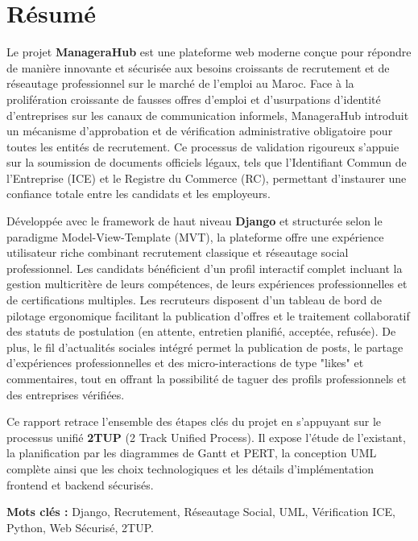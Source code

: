 \chapter*{Résumé}

Le projet \textbf{ManageraHub} est une plateforme web moderne conçue pour répondre de manière innovante et sécurisée aux besoins croissants de recrutement et de réseautage professionnel sur le marché de l'emploi au Maroc. Face à la prolifération croissante de fausses offres d'emploi et d'usurpations d'identité d'entreprises sur les canaux de communication informels, ManageraHub introduit un mécanisme d'approbation et de vérification administrative obligatoire pour toutes les entités de recrutement. Ce processus de validation rigoureux s'appuie sur la soumission de documents officiels légaux, tels que l'Identifiant Commun de l'Entreprise (ICE) et le Registre du Commerce (RC), permettant d'instaurer une confiance totale entre les candidats et les employeurs.

Développée avec le framework de haut niveau \textbf{Django} et structurée selon le paradigme Model-View-Template (MVT), la plateforme offre une expérience utilisateur riche combinant recrutement classique et réseautage social professionnel. Les candidats bénéficient d'un profil interactif complet incluant la gestion multicritère de leurs compétences, de leurs expériences professionnelles et de certifications multiples. Les recruteurs disposent d'un tableau de bord de pilotage ergonomique facilitant la publication d'offres et le traitement collaboratif des statuts de postulation (en attente, entretien planifié, acceptée, refusée). De plus, le fil d'actualités sociales intégré permet la publication de posts, le partage d'expériences professionnelles et des micro-interactions de type "likes" et commentaires, tout en offrant la possibilité de taguer des profils professionnels et des entreprises vérifiées.

Ce rapport retrace l'ensemble des étapes clés du projet en s'appuyant sur le processus unifié \textbf{2TUP} (2 Track Unified Process). Il expose l'étude de l'existant, la planification par les diagrammes de Gantt et PERT, la conception UML complète ainsi que les choix technologiques et les détails d'implémentation frontend et backend sécurisés.

\vspace{0.5cm}
\noindent \textbf{Mots clés :} Django, Recrutement, Réseautage Social, UML, Vérification ICE, Python, Web Sécurisé, 2TUP.

